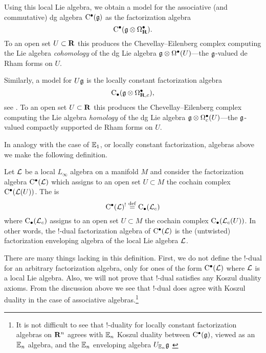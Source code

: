 Using this local Lie algebra, we obtain a model for the associative (and commutative) dg algebra ${\rm C}^\bullet(\mathfrak g)$ as the factorization algebra
\[
{\rm C}^\bullet(\mathfrak g \otimes \Omega^\bullet_{\mathbf{R}}).
\]
To an open set $U \subset \mathbf{R}$ this produces the Chevellay--Eilenberg complex computing the Lie algebra {\em cohomology} of the dg Lie algebra $\mathfrak g \otimes \Omega^\bullet(U)$---the $\mathfrak g$-valued de Rham forms on $U$.
 
Similarly, a model for $U \mathfrak g$ is the locally constant factorization algebra
\[
{\rm C}_\bullet(\mathfrak g \otimes \Omega^\bullet_{\mathbf{R},c}),
\]
see \cite[\S 3.4]{CG1}.
To an open set $U \subset \mathbf{R}$ this produces the Chevellay--Eilenberg complex computing the Lie algebra {\em homology} of the dg Lie algebra $\mathfrak g \otimes \Omega^\bullet_c(U)$---the $\mathfrak g$-valued compactly supported de Rham forms on $U$.

\parsec[s:generalkoszul]

In analogy with the case of $\mathbb E_1$, or locally constant factorization, algebras above we make the following definition. 

\begin{dfn}
Let $\mathcal L$ be a local $L_\infty$ algebra on a manifold $M$ and consider the factorization algebra ${\rm C}^\bullet(\mathcal L)$ which assigns to an open set $U \subset M$ the cochain complex ${\rm C}^\bullet(\mathcal L(U))$. 
The  is 
\[
{\rm C}^\bullet(\mathcal L)^! \overset{\rm def}{=} {\rm C}_\bullet (\mathcal L_{c}) 
\]
where ${\rm C}_\bullet(\mathcal L_c)$ assigns to an open set $U \subset M$ the cochain complex ${\rm C}_\bullet(\mathcal L_c(U))$.
In other words, the $!$-dual factorization algebra of ${\rm C}^\bullet(\mathcal L)$ is the (untwisted) factorization enveloping algebra of the local Lie algebra $\mathcal L$. 
\end{dfn} 

There are many things lacking in this definition. 
First, we do not define the $!$-dual for an arbitrary factorization algebra, only for ones of the form ${\rm C}^\bullet(\mathcal L)$ where $\mathcal L$ is a local Lie algebra. 
Also, we will not prove that $!$-dual satisfies any Koszul duality axioms. 
From the discussion above we see that $!$-dual does agree with Koszul duality in the case of associative algebras.\footnote{It is not difficult to see that $!$-duality for locally constant factorization algebras on $\mathbf{R}^n$ agrees with $\mathbb E_n$ Koszul duality between ${\rm C}^\bullet(\mathfrak g)$, viewed as an $\mathbb E_n$ algebra, and the $\mathbb E_n$ enveloping algebra $U_{\mathbb E_n} \mathfrak g$ \cite{Knudsen, Lurie}}

\parsec[s:noether]

